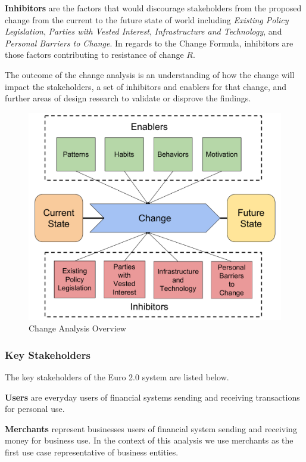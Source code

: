 \documentclass[12pt]{article} %
\begin{document}
{\textbf{Inhibitors} are the factors that would discourage stakeholders from the proposed change from the current to the future state of world including \textit{Existing Policy Legislation}, \textit{Parties with Vested Interest}, \textit{Infrastructure and Technology}, and \textit{Personal Barriers to Change}. In regards to the Change Formula, inhibitors are those factors contributing to resistance of change $R$.

The outcome of the change analysis is an understanding of how the change will impact the stakeholders, a set of inhibitors and enablers for that change, and further areas of design research to validate or disprove the findings.

\begin{figure}[ht]
    \centering
    \includegraphics[width=\textwidth]{change-analysis}
    \caption{Change Analysis Overview}
    \label{fig:changeAnalysis}
\end{figure}

\subsubsection{Key Stakeholders} \label{sssec:4.2:keyStakeholders}

The key stakeholders of the Euro 2.0 system are listed below.

\textbf{Users} are everyday users of financial systems sending and receiving transactions for personal use.

\textbf{Merchants} represent businesses users of financial system sending and receiving money for business use. In the context of this analysis we use merchants as the first use case representative of business entities.

}
\end{document}
